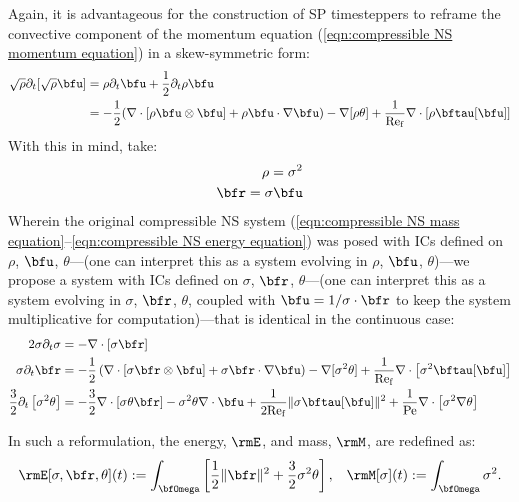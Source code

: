     Again, it is advantageous for the construction of SP timesteppers to reframe the convective component of the momentum equation (\ref{eqn:compressible NS momentum equation}) in a skew-symmetric form:
    \begin{align}
        \sqrt{\rho}\partial_{t}[\sqrt{\rho}\bfu]
        &=
        \rho\partial_{t}\bfu + \frac{1}{2}\partial_{t}\rho\bfu  \\
        &=
        - \frac{1}{2}(\nabla\cdot\left[\rho\bfu\otimes\bfu\right] + \rho\bfu\cdot\nabla\bfu) - \nabla[\rho\theta] + \frac{1}{\rmRef}\nabla\cdot[\rho\bftau[\bfu]]  \label{eqn:compressible NS skew-symmetric momentum equation}
    \end{align}
    With this in mind, take:
    \begin{align}
        \rho  =  \sigma^{2}  \label{eqn:sigma definition}  \\
        \bfr  =  \sigma\bfu  \label{eqn:r definition}
    \end{align}
    Wherein the original compressible NS system (\ref{eqn:compressible NS mass equation}--\ref{eqn:compressible NS energy equation}) was posed with ICs defined on $\rho$, $\bfu$, $\theta$---(one can interpret this as a system evolving in $\rho$, $\bfu$, $\theta$)---we propose a system with ICs defined on $\sigma$, $\bfr$, $\theta$---(one can interpret this as a system evolving in $\sigma$, $\bfr$, $\theta$, coupled with $\bfu = 1/\sigma\cdot\bfr$ to keep the system multiplicative for computation)---that is identical in the continuous case:
    \begin{align}
                                   2\sigma\partial_{t}\sigma  &=  - \nabla\cdot\left[\sigma\bfr\right]  \\
                                      \sigma\partial_{t}\bfr  &=  - \frac{1}{2}\left(\nabla\cdot\left[\sigma\bfr\otimes\bfu\right] + \sigma\bfr\cdot\nabla\bfu\right) - \nabla[\sigma^{2}\theta] + \frac{1}{\rmRef}\nabla\cdot\left[\sigma^{2}\bftau[\bfu]\right]  \\
        \frac{3}{2}\partial_{t}\left[\sigma^{2}\theta\right]  &=  - \frac{3}{2}\nabla\cdot\left[\sigma\theta\bfr\right] - \sigma^{2}\theta\nabla\cdot\bfu + \frac{1}{2\rmRef}\|\sigma\bftau[\bfu]\|^{2} + \frac{1}{\rmPe}\nabla\cdot\left[\sigma^{2}\nabla\theta\right]  \label{eqn:compressible NS sqrt energy equation}
    \end{align}

    In such a reformulation, the energy, $\rmE$, and mass, $\rmM$, are redefined as:
    \begin{align}
        \rmE[\sigma, \bfr, \theta](t)  :=  \int_{\bfOmega}\left[\frac{1}{2}\|\bfr\|^{2} + \frac{3}{2}\sigma^{2}\theta\right],  &&
                      \rmM[\sigma](t)  :=  \int_{\bfOmega}\sigma^{2}.
    \end{align}

